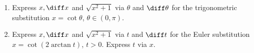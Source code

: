 \begin{enumerate}[ref={\fcProblemRef}]
\item \label{problemTheoreticalTrigSubx=cott} Express $x, \diff x $ and $\sqrt{x^2+1 }$ via $\theta$ and $\diff \theta$ for the trigonometric substitution $x=\cot \theta $, $\theta\in \left(0,\pi\right)$.
\item \label{problemTheoreticalTrigSubx=cot(2arctant)} Express $x, \diff x $ and $\sqrt{x^2+1}$ via $t$ and $\diff t$ for the Euler substitution $x=\cot(2\arctan t)$, $t>0$. Express $t$ via $x$.
\end{enumerate}


